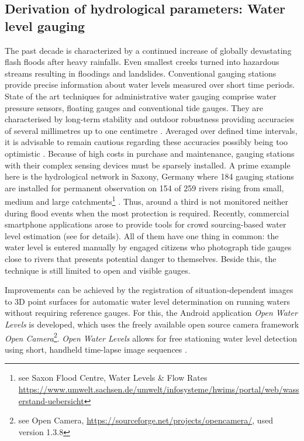 \documentclass[review]{elsarticle}
\begin{document}
\subsection{Derivation of hydrological parameters: Water level gauging}
\label{sec:water_level_gauging_intro}
The past decade is characterized by a continued increase of globally devastating flash floods after heavy rainfalls. Even smallest creeks turned into hazardous streams resulting in floodings and landslides. Conventional gauging stations provide precise information about water levels measured over short time periods. State of the art techniques for administrative water gauging comprise water pressure sensors, floating gauges and conventional tide gauges. They are characterised by long-term stability and outdoor robustness providing accuracies of several millimetres up to one centimetre \cite{Siedschlag2015}. Averaged over defined time intervals, it is advisable to remain cautious regarding these accuracies possibly being too optimistic \cite{Horner2018}. Because of high costs in purchase and maintenance, gauging stations with their complex sensing devices must be sparsely installed. A prime example here is the hydrological network in Saxony, Germany where 184 gauging stations are installed for permanent observation on 154 of 259 rivers rising from small, medium and large catchments\footnote{see Saxon Flood Centre, Water Levels \& Flow Rates \url{https://www.umwelt.sachsen.de/umwelt/infosysteme/hwims/portal/web/wasserstand-uebersicht}} \cite{Buettner2015}. Thus, around a third is not monitored neither during flood events when the most protection is required. Recently, commercial smartphone applications arose to provide tools for crowd sourcing-based water level estimation (see \cite{CrowdWaterApp2017a,Kisters2014} for details). All of them have one thing in common: the water level is entered manually by engaged citizens who photograph tide gauges close to rivers that presents potential danger to themselves. Beside this, the technique is still limited to open and visible gauges.

Improvements can be achieved by the registration of situation-dependent images to 3D point surfaces  for automatic water level determination on running waters without requiring reference gauges. 
For this, the Android application \textit{Open Water Levels} is developed, which uses the freely available open source camera framework \textit{Open Camera}\footnote{see Open Camera, \url{https://sourceforge.net/projects/opencamera/}, used version 1.3.8}. \textit{Open Water Levels} allows for free stationing water level detection using short, handheld time-lapse image sequences \cite{Kroehnert2017a}. 
\end{document}
